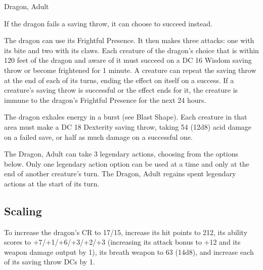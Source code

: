 \begin{DndMonster}[float*=b,width=\textwidth + 8pt]{Dragon, Adult}
\begin{multicols}{2}
 If the dragon fails a saving throw, it can choose to succeed instead.

 The dragon can use its Frightful Presence. It then makes three attacks: one with its bite and two with its claws.
\DndMonsterAttack[
	name=Bite,
	distance=melee,
	type=weapon,
	mod=+11,
	reach=10,
	dmg=\DndDice{2d10 + 6},
	dmg-type=piercing,
	extra={ plus 4 (1d8) damage of the dragon's Damage Type.}
]
\DndMonsterAttack[
	name=Claw,
	distance=melee,
	type=weapon,
	mod=+11,
	reach=5,
	dmg=\DndDice{2d6 + 6},
	dmg-type=slashing
]
\DndMonsterAttack[
	name=Tail,
	distance=melee,
	type=weapon,
	mod=+11,
	reach=15,
	dmg=\DndDice{2d8 + 6},
	dmg-type=bludgeoning
]
Each creature of the dragon's choice that is within 120 feet of the dragon and aware of it must succeed on a DC 16 Wisdom saving throw or become frightened for 1 minute. A creature can repeat the saving throw at the end of each of its turns, ending the effect on itself on a success. If a creature's saving throw is successful or the effect ends for it, the creature is immune to the dragon's Frightful Presence for the next 24 hours.

The dragon exhales energy in a burst (see Blast Shape). Each creature in that area must make a DC 18 Dexterity saving throw, taking 54 (12d8) acid damage on a failed save, or half as much damage on a successful one.

The Dragon, Adult can take 3 legendary actions, choosing from the options below. Only one legendary action option can be used at a time and only at the end of another creature's turn. The Dragon, Adult regains spent legendary actions at the start of its turn.
\begin{DndMonsterLegendaryActions}
\end{DndMonsterLegendaryActions}

\subsection{Scaling}
To increase the dragon's CR to 17/15, increase its hit points to 212, its ability scores to +7/+1/+6/+3/+2/+3 (increasing its attack bonus to +12 and its weapon damage output by 1), its breath weapon to 63 (14d8), and increase each of its saving throw DCs by 1.


\end{multicols}
\end{DndMonster}
